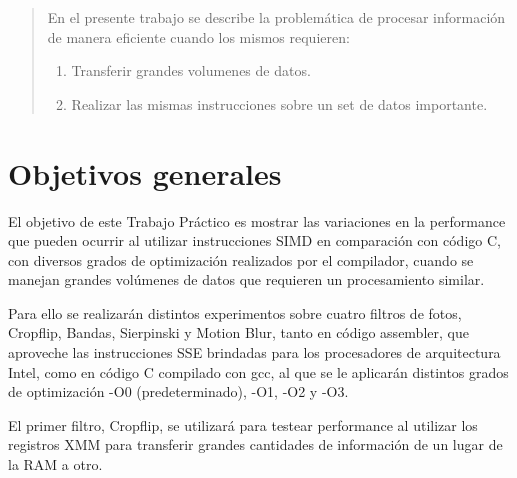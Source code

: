 \documentclass[a4paper]{article}
\begin{document}
\thispagestyle{empty}

\maketitle
\newpage

\thispagestyle{empty}
\vfill
\begin{abstract}
En el presente trabajo se describe la problemática de procesar información de manera eficiente cuando los mismos requieren:
\begin{enumerate}
\item Transferir grandes volumenes de datos.
\item Realizar las mismas instrucciones sobre un set de datos importante.
\end{enumerate}
\end{abstract}
\thispagestyle{empty}
\vspace{3cm}
\tableofcontents
\newpage

\newpage

\section{Objetivos generales}

El objetivo de este Trabajo Práctico es mostrar las variaciones en la performance que pueden ocurrir al utilizar instrucciones SIMD en comparación con código C, con diversos grados de optimización realizados por el compilador, cuando se manejan grandes volúmenes de datos que requieren un procesamiento similar.

Para ello se realizarán distintos experimentos sobre cuatro filtros de fotos, Cropflip, Bandas, Sierpinski y Motion Blur, tanto en código assembler, que aproveche las instrucciones SSE brindadas para los procesadores de arquitectura Intel, como en código C compilado con gcc, al que se le aplicarán distintos grados de optimización -O0 (predeterminado), -O1, -O2 y -O3.

El primer filtro, Cropflip, se utilizará para testear performance al utilizar los registros XMM para transferir grandes cantidades de información de un lugar de la RAM a otro.
\end{document}
